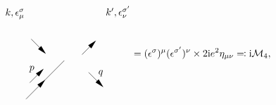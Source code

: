 \begin{equation}
\begin{gathered}
\begin{tikzpicture}[x=0.75pt,y=0.75pt,yscale=-1,xscale=1]
            \draw    (131,237) -- (183,185) ;
            \draw [shift={(157,211)}, rotate = 135] [fill={rgb, 255:red, 0; green, 0; blue, 0 }  ][line width=0.08]  [draw opacity=0] (12,-3) -- (0,0) -- (12,3) -- cycle    ;
            \draw    (216,201) -- (234.59,219.59) ;
            \draw [shift={(236,221)}, rotate = 225] [fill={rgb, 255:red, 0; green, 0; blue, 0 }  ][line width=0.08]  [draw opacity=0] (12,-3) -- (0,0) -- (12,3) -- cycle    ;
            \draw    (136,215) -- (153.59,197.41) ;
            \draw [shift={(155,196)}, rotate = 135] [fill={rgb, 255:red, 0; green, 0; blue, 0 }  ][line width=0.08]  [draw opacity=0] (12,-3) -- (0,0) -- (12,3) -- cycle    ;
            \draw    (207,177) -- (224.59,159.41) ;
            \draw [shift={(226,158)}, rotate = 135] [fill={rgb, 255:red, 0; green, 0; blue, 0 }  ][line width=0.08]  [draw opacity=0] (12,-3) -- (0,0) -- (12,3) -- cycle    ;
            \draw    (138,156) -- (156.59,174.59) ;
            \draw [shift={(158,176)}, rotate = 225] [fill={rgb, 255:red, 0; green, 0; blue, 0 }  ][line width=0.08]  [draw opacity=0] (12,-3) -- (0,0) -- (12,3) -- cycle    ;
            
            \draw (130,130.6) node [anchor=south east] [inner sep=0.75pt]    {$k,\epsilon _{\mu }^{\sigma }$};
            \draw (238,128.6) node [anchor=south west] [inner sep=0.75pt]    {$k',\epsilon _{\nu }^{\sigma '}$};
            \draw (143.5,202.1) node [anchor=south east] [inner sep=0.75pt]    {$p$};
            \draw (228,207.6) node [anchor=south west] [inner sep=0.75pt]    {$q$};
            \end{tikzpicture}            
    \end{gathered} = (\epsilon^\sigma)^\mu (\epsilon^{\sigma'})^\nu \times 2 \ii e^2 \eta_{\mu \nu} \eqqcolon \ii \mathcal{M}_4,
\end{equation}